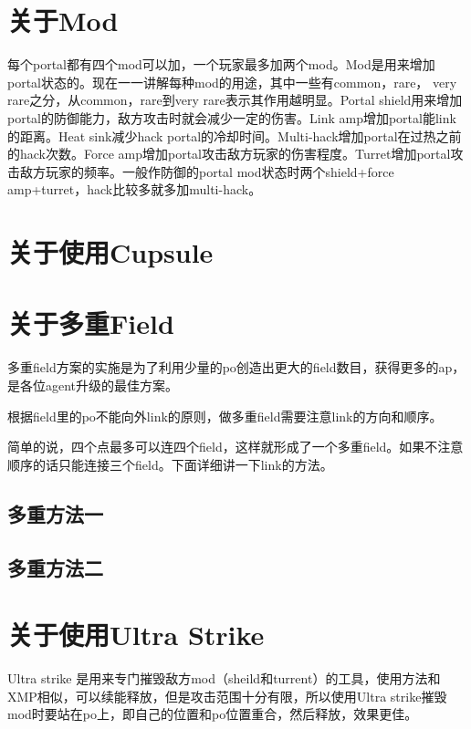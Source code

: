 \documentclass[a4paper]{article}
\begin{document}
\section{关于Mod}
每个portal都有四个mod可以加，一个玩家最多加两个mod。Mod是用来增加portal状态的。现在一一讲解每种mod的用途，其中一些有common，rare， very rare之分，从common，rare到very rare表示其作用越明显。Portal shield用来增加portal的防御能力，敌方攻击时就会减少一定的伤害。Link amp增加portal能link的距离。Heat sink减少hack portal的冷却时间。Multi-hack增加portal在过热之前的hack次数。Force amp增加portal攻击敌方玩家的伤害程度。Turret增加portal攻击敌方玩家的频率。一般作防御的portal mod状态时两个shield+force amp+turret，hack比较多就多加multi-hack。

\section{关于使用Cupsule}

\section{关于多重Field}
多重field方案的实施是为了利用少量的po创造出更大的field数目，获得更多的ap，是各位agent升级的最佳方案。\par
根据field里的po不能向外link的原则，做多重field需要注意link的方向和顺序。\par
简单的说，四个点最多可以连四个field，这样就形成了一个多重field。如果不注意顺序的话只能连接三个field。下面详细讲一下link的方法。\par
\subsection{多重方法一}

\subsection{多重方法二}

\section{关于使用Ultra Strike}
Ultra strike 是用来专门摧毁敌方mod（sheild和turrent）的工具，使用方法和XMP相似，可以续能释放，但是攻击范围十分有限，所以使用Ultra strike摧毁mod时要站在po上，即自己的位置和po位置重合，然后释放，效果更佳。
\end{document}
